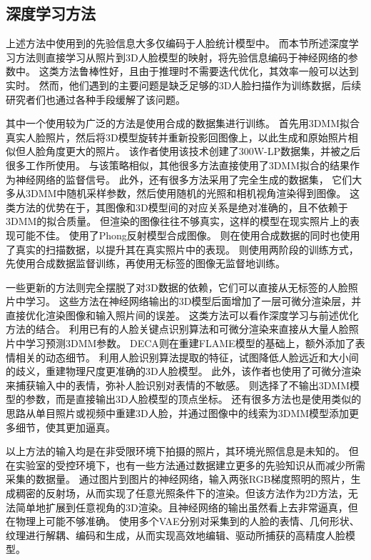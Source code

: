 \subsection{深度学习方法}

上述方法中使用到的先验信息大多仅编码于人脸统计模型中。
而本节所述深度学习方法则直接学习从照片到3D人脸模型的映射，将先验信息编码于神经网络的参数中。
这类方法鲁棒性好，且由于推理时不需要迭代优化，其效率一般可以达到实时。
然而，他们遇到的主要问题是缺乏足够的3D人脸扫描作为训练数据，后续研究者们也通过各种手段缓解了该问题。

其中一个使用较为广泛的方法是使用合成的数据集进行训练。
\citet{zhu2016face}首先用3DMM拟合真实人脸照片，然后将3D模型旋转并重新投影回图像上，以此生成和原始照片相似但人脸角度更大的照片。
该作者使用该技术创建了300W-LP数据集，并被之后很多工作所使用。
与该策略相似，其他很多方法\citep{trần2018extreme,chaudhuri2019joint}直接使用了3DMM拟合的结果作为神经网络的监督信号。
此外，还有很多方法采用了完全生成的数据集，
它们大多从3DMM中随机采样参数，然后使用随机的光照和相机视角渲染得到图像。
这类方法的优势在于，其图像和3D模型间的对应关系是绝对准确的，且不依赖于3DMM的拟合质量。
但渲染的图像往往不够真实，这样的模型在现实照片上的表现可能不佳。
\citet{richardson20163d}使用了Phong反射模型合成图像。
\citet{dou2017end}则在使用合成数据的同时也使用了真实的扫描数据，以提升其在真实照片中的表现。
\citet{genova2018unsupervised}则使用两阶段的训练方式，先使用合成数据监督训练，再使用无标签的图像无监督地训练。

一些更新的方法则完全摆脱了对3D数据的依赖，它们可以直接从无标签的人脸照片中学习。
这些方法在神经网络输出的3D模型后面增加了一层可微分渲染层，并直接优化渲染图像和输入照片间的误差。
这类方法可以看作深度学习与前述优化方法的结合。
\citet{deep3d,bao2022}利用已有的人脸关键点识别算法和可微分渲染来直接从大量人脸照片中学习预测3DMM参数。
DECA\citep{DECA}则在重建FLAME模型的基础上，额外添加了表情相关的动态细节。
\citet{ZielonkaBT22}利用人脸识别算法提取的特征，试图降低人脸远近和大小间的歧义，重建物理尺度更准确的3D人脸模型。
此外，该作者也使用了可微分渲染来捕获输入中的表情，弥补人脸识别对表情的不敏感。
\citet{shen2022,feng2018prn}则选择了不输出3DMM模型的参数，而是直接输出3D人脸模型的顶点坐标。
还有很多方法\citep{CaoBZB15,IchimBP15}也是使用类似的思路从单目照片或视频中重建3D人脸，并通过图像中的线索为3DMM模型添加更多细节，使其更加逼真。

以上方法的输入均是在非受限环境下拍摄的照片，其环境光照信息是未知的。
但在实验室的受控环境下，也有一些方法通过数据建立更多的先验知识从而减少所需采集的数据量。
\citet{MekaHPZFFKYBDDB19}通过图片到图片的神经网络，输入两张RGB梯度照明的照片，生成稠密的反射场，从而实现了任意光照条件下的渲染。但该方法作为2D方法，无法简单地扩展到任意视角的3D渲染。且神经网络的输出虽然看上去非常逼真，但在物理上可能不够准确。
\citet{ZhangZZLCYXY22}使用多个VAE分别对采集到的人脸的表情、几何形状、纹理进行解耦、编码和生成，从而实现高效地编辑、驱动所捕获的高精度人脸模型。

